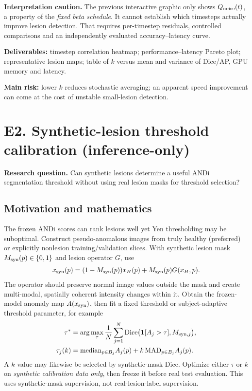 \documentclass[10pt,a4paper]{article}
\newcommand{\hyps}[1]{\begin{summarybox}\textbf{Research question.} #1\end{summarybox}}
\begin{document}
\textbf{Interpretation caution.} The previous interactive graphic only shows $Q_{\rm noise}(t)$, a property of the \emph{fixed beta schedule}. It cannot establish which timesteps actually improve lesion detection. That requires per-timestep residuals, controlled comparisons and an independently evaluated accuracy--latency curve.\par
\textbf{Deliverables:} timestep correlation heatmap; performance--latency Pareto plot; representative lesion maps; table of $k$ versus mean and variance of Dice/AP, GPU memory and latency.\par
\textbf{Main risk:} lower $k$ reduces stochastic averaging; an apparent speed improvement can come at the cost of unstable small-lesion detection.
\section{E2. Synthetic-lesion threshold calibration (inference-only)}
\hyps{Can synthetic lesions determine a useful ANDi segmentation threshold without using real lesion masks for threshold selection?}
\subsection{Motivation and mathematics}
The frozen ANDi scores can rank lesions well yet Yen thresholding may be suboptimal. Construct pseudo-anomalous images from truly healthy (preferred) or explicitly nonlesion training/validation slices. With synthetic lesion mask $M_{\rm syn}(p)\in\{0,1\}$ and lesion operator $G$, use
\begin{equation}
 x_{\rm syn}(p)=(1-M_{\rm syn}(p))x_H(p)+M_{\rm syn}(p)G(x_H,p).
\end{equation}
The operator should preserve normal image values outside the mask and create multi-modal, spatially coherent intensity changes within it. Obtain the frozen-model anomaly map $A(x_{\rm syn})$, then fit a fixed threshold or subject-adaptive threshold parameter, for example
\begin{align}
 \tau^*&=\arg\max_{\tau}\frac1N\sum_{j=1}^N
 \mathrm{Dice}\big(\mathbf1[A_j>\tau],M_{{\rm syn},j}\big),\\
 \tau_j(k)&=\mathrm{median}_{p\in B_j}A_j(p)
 +k\,\mathrm{MAD}_{p\in B_j}A_j(p).
\end{align}
A $k$ value may likewise be selected by synthetic-mask Dice. Optimize either $\tau$ or $k$ on \emph{synthetic calibration data only}, then freeze it before real test evaluation. This uses synthetic-mask supervision, not real-lesion-label supervision.
\end{document}
